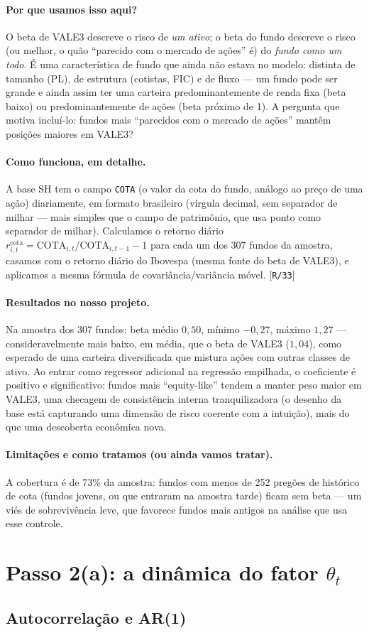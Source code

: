 \documentclass[11pt,a4paper]{article}
\newcommand{\porque}[0]{\paragraph{Por que usamos isso aqui?}}
\newcommand{\comofunciona}[0]{\paragraph{Como funciona, em detalhe.}}
\newcommand{\resultados}[0]{\paragraph{Resultados no nosso projeto.}}
\newcommand{\limitacoes}[0]{\paragraph{Limitações e como tratamos (ou ainda vamos tratar).}}
\newcommand{\scriptref}[1]{{\footnotesize\color{cinza}[\texttt{#1}]}}
\begin{document}
\porque O beta de VALE3 descreve o risco de \emph{um ativo}; o beta do fundo descreve o risco (ou
melhor, o quão ``parecido com o mercado de ações'' é) do \emph{fundo como um todo}. É uma
característica de fundo que ainda não estava no modelo: distinta de tamanho (PL), de estrutura
(cotistas, FIC) e de fluxo --- um fundo pode ser grande e ainda assim ter uma carteira
predominantemente de renda fixa (beta baixo) ou predominantemente de ações (beta próximo de 1).
A pergunta que motiva incluí-lo: fundos mais ``parecidos com o mercado de ações'' mantêm posições
maiores em VALE3?

\comofunciona A base SH tem o campo \texttt{COTA} (o valor da cota do fundo, análogo ao preço de
uma ação) diariamente, em formato brasileiro (vírgula decimal, sem separador de milhar --- mais
simples que o campo de patrimônio, que usa ponto como separador de milhar). Calculamos o retorno
diário $r^{\text{cota}}_{i,t} = \text{COTA}_{i,t}/\text{COTA}_{i,t-1} - 1$ para cada um dos 307
fundos da amostra, casamos com o retorno diário do Ibovespa (mesma fonte do beta de VALE3), e
aplicamos a mesma fórmula de covariância/variância móvel. \scriptref{R/33}

\resultados Na amostra dos 307 fundos: beta médio $0{,}50$, mínimo $-0{,}27$, máximo $1{,}27$ ---
consideravelmente mais baixo, em média, que o beta de VALE3 ($1{,}04$), como esperado de uma
carteira diversificada que mistura ações com outras classes de ativo. Ao entrar como regressor
adicional na regressão empilhada, o coeficiente é positivo e significativo: fundos mais
``equity-like'' tendem a manter peso maior em VALE3, uma checagem de consistência interna
tranquilizadora (o desenho da base está capturando uma dimensão de risco coerente com a
intuição), mais do que uma descoberta econômica nova.

\limitacoes A cobertura é de $73\%$ da amostra: fundos com menos de 252 pregões de histórico de
cota (fundos jovens, ou que entraram na amostra tarde) ficam sem beta --- um viés de sobrevivência
leve, que favorece fundos mais antigos na análise que usa esse controle.

\section{Passo 2(a): a dinâmica do fator $\theta_t$}
\label{sec:dyn}

\subsection{Autocorrelação e AR(1)}
\end{document}

